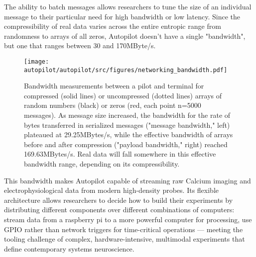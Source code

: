 The ability to batch messages allows researchers to tune the size of an individual message to their particular need for high bandwidth or low latency. Since the compressibility of real data varies across the entire entropic range from randomness to arrays of all zeros, Autopilot doesn't have a single "bandwidth", but one that ranges between 30 and 170MByte/s. %
%
\begin{figure}[t]
\texttt{[image: autopilot/autopilot/src/figures/networking\_bandwidth.pdf]}
\caption{Bandwidth measurements between a pilot and terminal for compressed (solid lines) or uncompressed (dotted lines) arrays of random numbers (black) or zeros (red, each point n=5000 messages). As message size increased, the bandwidth for the rate of bytes transferred in serialized messages ("message bandwidth," left) plateaued at 29.25MBytes/s, while the effective bandwidth of arrays before and after compression ("payload bandwidth," right) reached 169.63MBytes/s. Real data will fall somewhere in this effective bandwidth range, depending on its compressibility.}
\label{fig:bandwidth}
\end{figure}%
%
This bandwidth makes Autopilot capable of streaming raw Calcium imaging and electrophysiological data from modern high-density probes. Its flexible architecture allows researchers to decide how to build their experiments by distributing different components over different combinations of computers: stream data from a raspberry pi to a more powerful computer for processing, use GPIO rather than network triggers for time-critical operations --- meeting the tooling challenge of complex, hardware-intensive, multimodal experiments that define contemporary systems neuroscience.